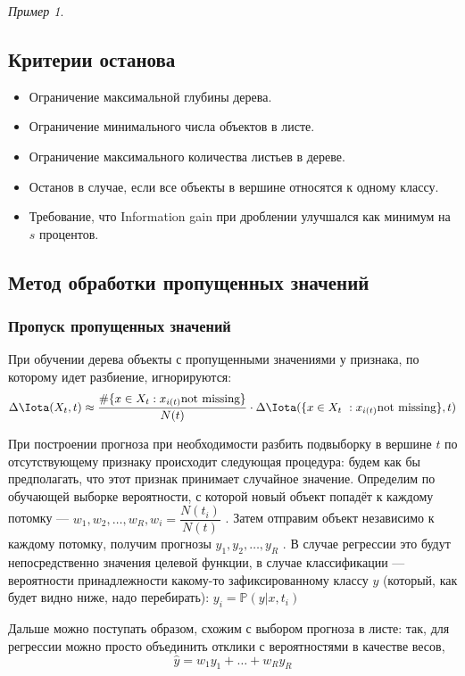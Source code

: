 \documentclass[a4paper, 12pt]{article}
\theoremstyle{plain} %
\theoremstyle{definition} %
\theoremstyle{remark} %
\newtheorem{example}{Пример}
\begin{document}
\begin{example}
\subsection{Критерии останова}

\begin{itemize}
	\item Ограничение максимальной глубины дерева.
	\item Ограничение минимального числа объектов в листе.
	\item Ограничение максимального количества листьев в дереве.
	\item Останов в случае, если все объекты в вершине относятся к одному классу.
	\item Требование, что Information gain при дроблении улучшался как минимум на $ s $
 процентов.
\end{itemize}
\subsection{Метод обработки пропущенных значений}

\subsubsection{Пропуск пропущенных значений}

При обучении дерева объекты с пропущенными значениями у признака, по которому идет разбиение, игнорируются:
\[
\Delta\Iota(X_t, t) \approx \dfrac{\#\{x \in X_t: x_{i(t)} \mbox{not missing}\}}{N(t)} \cdot \Delta\Iota(\{x \in X_t : x_{i(t)} \mbox{not missing}\}, t)
\]


При построении прогноза при необходимости разбить подвыборку в вершине $ t $
по отсутствующему признаку происходит следующая процедура: будем как бы предполагать, что этот признак принимает случайное значение. Определим по обучающей выборке вероятности, с которой новый объект попадёт к каждому потомку — $ w_1, w_2, \dots, w_R, w_i = \dfrac{N(t_i)}{N(t)} $
. Затем отправим объект независимо к каждому потомку, получим прогнозы $ y_1, y_2, \dots, y_R $
. В случае регрессии это будут непосредственно значения целевой функции, в случае классификации — вероятности принадлежности какому-то зафиксированному классу $ y $
(который, как будет видно ниже, надо перебирать): $ y_i = \mathbb{P}(y|x, t_i) $


Дальше можно поступать образом, схожим с выбором прогноза в листе: так, для регрессии можно просто объединить отклики с вероятностями в качестве весов,
\[\hat{y} = w_{1}y_{1} + \dots + w_{R}y_{R}\]


\end{example}
\end{document}
